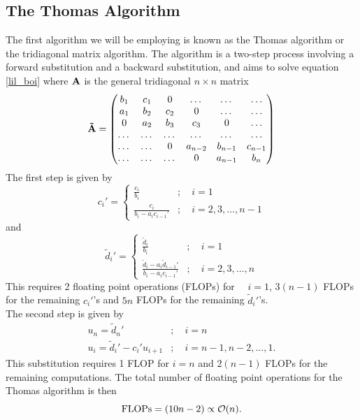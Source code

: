 \documentclass[notitlepage, reprint, nofootinbib]{revtex4-1}
\begin{document}
\subsection{The Thomas Algorithm}
The first algorithm we will be employing is known as the Thomas algorithm\cite{algo1} or the tridiagonal matrix algorithm. The algorithm is a two-step process involving a forward substitution and a backward substitution, and aims to solve equation \ref{lil_boi} where $\vb{A}$ is the general tridiagonal $n\times n$ matrix 
\begin{equation}\label{big_boi_bro}\vb{\tilde{A}} = \mqty(b_1&c_1&0&\dots&\dots&\dots\\a_1&b_2&c_2&0&\dots&\dots\\0&a_2&b_3&c_3&0&\dots\\ \dots&\dots&\dots&\dots&\dots&\dots\\ \dots&\dots&0&a_{n-2}&b_{n-1}&c_{n-1}\\ \dots&\dots&\dots&0&a_{n-1}&b_n)\end{equation}
The first step is given by  
\begin{equation}c_i' =\begin{cases} \frac{c_i}{b_i}&; \quad i=1\\ \frac{c_i}{b_i-a_ic_{i-1}'}&;\quad i=2,3,\dots,n-1\end{cases}\end{equation}
and 
\begin{equation}\tilde{d}_i'=\begin{cases}\frac{\tilde{d}_i}{b_i}&;\quad i=1\\ \frac{\tilde{d}_i-a_i\tilde{d}_{i-1}'}{b_i-a_ic_{i-1}'}&;\quad i=2, 3,\dots,n\end{cases}\end{equation}
This requires 2 floating point operations (FLOPs) for \ \ $i=1$, $3(n-1)$ FLOPs for the remaining $c_i'$'s and $5n$ FLOPs for the remaining $\tilde{d}_i'$'s.\\[2mm]
The second step is given by
\begin{align}
	u_n=\tilde{d}_n'&; \quad i=n\\
	u_i=\tilde{d}_i'-c_i'u_{i+1}&;\quad i=n-1,n-2,\dots,1.
\end{align}
This substitution requires 1 FLOP for $i=n$ and $2(n-1)$ FLOPs for the remaining computations. The total number of floating point operations for the Thomas algorithm is then
\begin{equation}\label{FLOP_thomas} \text{FLOPs} = (10n-2) \propto \order{n}.\end{equation}
\end{document}
